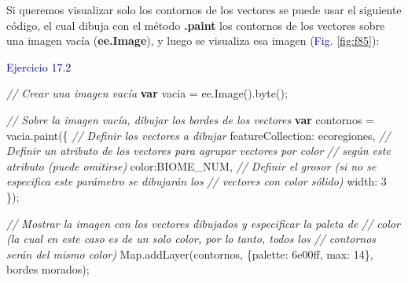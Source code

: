 \documentclass[
  12pt,
  letterpaper,
  twoside]{book}
\newenvironment{Shaded}{\begin{snugshade}}{\end{snugshade}}
\newcommand{\CommentTok}[1]{\textcolor[rgb]{0.24,0.58,0.00}{\textit{#1}}}
\newcommand{\ControlFlowTok}[1]{\textcolor[rgb]{0.00,0.00,0.00}{\textbf{#1}}}
\newcommand{\DataTypeTok}[1]{\textcolor[rgb]{0.00,0.00,0.00}{#1}}
\newcommand{\DecValTok}[1]{\textcolor[rgb]{0.28,0.53,0.93}{#1}}
\newcommand{\FunctionTok}[1]{\textcolor[rgb]{0.48,0.12,0.64}{#1}}
\newcommand{\KeywordTok}[1]{\textcolor[rgb]{0.48,0.12,0.64}{#1}}
\newcommand{\NormalTok}[1]{#1}
\newcommand{\OperatorTok}[1]{\textcolor[rgb]{0.00,0.00,0.00}{#1}}
\newcommand{\StringTok}[1]{\textcolor[rgb]{0.87,0.29,0.22}{#1}}
\newcommand\boldpurple[1]{\textcolor{darkpurple}{\textbf{#1}}}
\begin{document}
Si queremos visualizar solo los contornos de los vectores se puede usar el siguiente código, el cual dibuja con el método \boldpurple{.paint} los contornos de los vectores sobre una imagen vacía (\boldpurple{ee.Image}), y luego se visualiza esa imagen (\textcolor{darkblue}{Fig.} \ref{fig:f85}):

\textcolor{darkblue}{Ejercicio 17.2}

\begin{Shaded}
\begin{Highlighting}[]
\CommentTok{// Crear una imagen vacía}
\ControlFlowTok{var}\NormalTok{ vacia }\OperatorTok{=} \KeywordTok{ee}\OperatorTok{.}\FunctionTok{Image}\NormalTok{()}\OperatorTok{.}\FunctionTok{byte}\NormalTok{()}\OperatorTok{;}

\CommentTok{// Sobre la imagen vacía, dibujar los bordes de los vectores}
\ControlFlowTok{var}\NormalTok{ contornos }\OperatorTok{=}\NormalTok{ vacia}\OperatorTok{.}\FunctionTok{paint}\NormalTok{(\{}
  \CommentTok{// Definir los vectores a dibujar}
  \DataTypeTok{featureCollection}\OperatorTok{:}\NormalTok{ ecoregiones}\OperatorTok{,}  
  \CommentTok{// Definir un atributo de los vectores para agrupar vectores por color }
  \CommentTok{// según este atributo (puede omitirse)}
  \DataTypeTok{color}\OperatorTok{:}\StringTok{\textquotesingle{}BIOME\_NUM\textquotesingle{}}\OperatorTok{,}  
  \CommentTok{// Definir el grosor (si no se especifica este parámetro se dibujarán los   }
  \CommentTok{// vectores con color sólido)       }
  \DataTypeTok{width}\OperatorTok{:} \DecValTok{3}                          
\NormalTok{\})}\OperatorTok{;}

\CommentTok{// Mostrar la imagen con los vectores dibujados y especificar la paleta de}
\CommentTok{// color (la cual en este caso es de un solo color, por lo tanto, todos los}
\CommentTok{// contornos serán del mismo color)}
\KeywordTok{Map}\OperatorTok{.}\FunctionTok{addLayer}\NormalTok{(contornos}\OperatorTok{,}\NormalTok{ \{}\DataTypeTok{palette}\OperatorTok{:} \StringTok{\textquotesingle{}6e00ff\textquotesingle{}}\OperatorTok{,} \DataTypeTok{max}\OperatorTok{:} \DecValTok{14}\NormalTok{\}}\OperatorTok{,} 
  \StringTok{\textquotesingle{}bordes morados\textquotesingle{}}\NormalTok{)}\OperatorTok{;} 


\end{Highlighting}
\end{Shaded}
\end{document}
